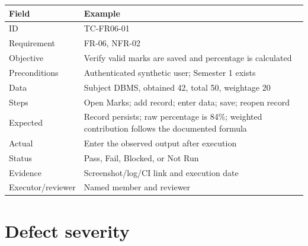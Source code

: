 \documentclass[
  10pt,
  a4paper,
  oneside]{report}
\newcounter{none} %
\begin{document}
{\def\LTcaptype{none} %
\begin{longtable}[]{@{}
  >{\raggedright\arraybackslash}p{}
  >{\raggedright\arraybackslash}p{}@{}}
\toprule\noalign{}
\begin{minipage}[b]{\linewidth}\raggedright
Field
\end{minipage} & \begin{minipage}[b]{\linewidth}\raggedright
Example
\end{minipage} \\
\midrule\noalign{}
\endhead
\bottomrule\noalign{}
\endlastfoot
ID & TC-FR06-01 \\
Requirement & FR-06, NFR-02 \\
Objective & Verify valid marks are saved and percentage is calculated \\
Preconditions & Authenticated synthetic user; Semester 1 exists \\
Data & Subject DBMS, obtained 42, total 50, weightage 20 \\
Steps & Open Marks; add record; enter data; save; reopen record \\
Expected & Record persists; raw percentage is 84\%; weighted
contribution follows the documented formula \\
Actual & Enter the observed output after execution \\
Status & Pass, Fail, Blocked, or Not Run \\
Evidence & Screenshot/log/CI link and execution date \\
Executor/reviewer & Named member and reviewer \\
\end{longtable}
}

\section{Defect severity}\label{165-defect-severity}
\end{document}
